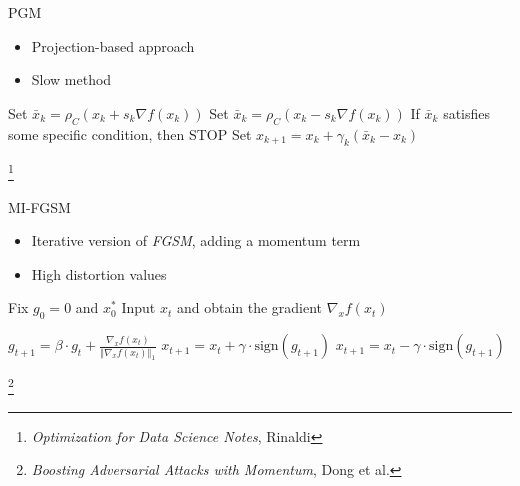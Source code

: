 \documentclass{beamer}
\theoremstyle{plain}
\theoremstyle{definition}
\newcommand\blfootnote[1]{%
  \begingroup
  \renewcommand\thefootnote{}\footnote{#1}%
  \addtocounter{footnote}{-1}%
  \endgroup
}
\begin{document}
\begin{frame}{PGM}

\begin{itemize}
    \item Projection-based approach 
    \item Slow method 
\end{itemize}
    \begin{algorithm}[H]
\caption{PGM}\label{PGD}
\begin{algorithmic}[1]
  \State Set $ \bar{x}_k = \rho_C(x_k + s_k \nabla f(x_k))$ 
  \State Set $ \bar{x}_k = \rho_C(x_k - s_k \nabla f(x_k))$ 
  \State If $\bar{x}_k$ satisfies some specific condition, then STOP
  \State Set $x_{k+1} = x_k + \gamma_k (\bar{x}_k - x_k)$ \Comment{with $\gamma_k \in (0, 1]$}
    
\EndFor
\end{algorithmic}
\end{algorithm}

\blfootnote{\textit{Optimization for Data Science Notes}, Rinaldi}
\end{frame}

\begin{frame}{MI-FGSM}
\begin{itemize}
    \item Iterative version of \textit{FGSM}, adding a momentum term 
    \item High distortion values
\end{itemize}

    \begin{algorithm}[H]
\caption{MI-FGSM}\label{MI_FGSM}
\begin{algorithmic}[1]

\State Fix $g_0 = 0$ and $x_{0}^\ast$ %
    \State Input $x_t$ and obtain the gradient $\nabla_x f(x_t)$

    \State $
        g_{t+1} = \beta \cdot g_t + \frac{\nabla_x f(x_t)}{\Vert \nabla_x f(x_t) \Vert_1}$
    \State $
        x_{t+1} = x_t + \gamma \cdot \text{sign} (g_{t+1}) $ 
    \State $x_{t+1} = x_t - \gamma \cdot \text{sign} (g_{t+1}) $ 
    
\EndFor
\end{algorithmic}
\end{algorithm}

\blfootnote{\textit{Boosting Adversarial Attacks with Momentum}, Dong et al.}
\end{frame}
\end{document}
